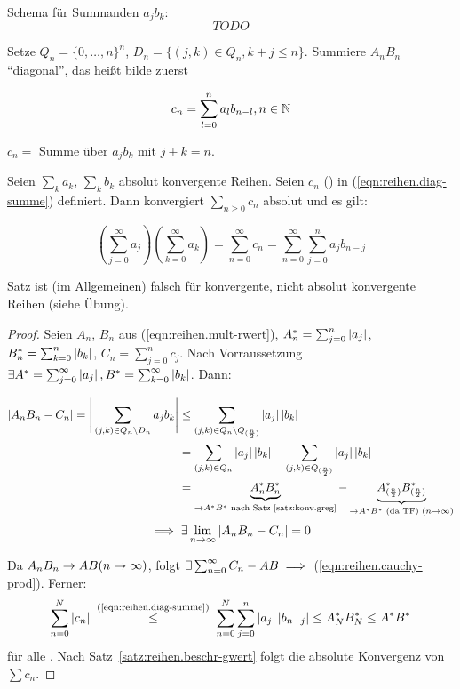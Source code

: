 \documentclass[12pt]{scrreprt}
\begin{document}
Schema für Summanden $a_jb_k$:
\[TODO\]

Setze $Q_n = \{0, \dotsc, n\}^n$, $D_n = \{(j, k) \in Q_n, k+j \le n\}$.
Summiere $A_nB_n$ "`diagonal"', das heißt bilde zuerst

\begin{equation}\label{eqn:reihen.diag-summe}
c_n = \sum_{l=0}^n a_lb_{n-l}, n \in \mathbb{N}
\end{equation}

$c_n = $ Summe über $a_jb_k$ mit $j+k = n$.

\begin{satz}\label{satz:reihen.cauchy-prod}
Seien $\sum_k a_k$, $\sum_k b_k$ absolut konvergente Reihen. Seien $c_n$ () in (\ref{eqn:reihen.diag-summe}) definiert.
Dann konvergiert $\sum_{n\ge0} c_n$ absolut und es gilt:

\begin{equation}\label{eqn:reihen.cauchy-prod}
\left(\sum_{j=0}^\infty a_j\right)\left(\sum_{k=0}^\infty a_k\right) = \sum_{n=0}^\infty c_n = \sum_{n=0}^\infty \sum_{j=0}^n a_jb_{n-j}
\end{equation}
\end{satz}

\begin{bem*}
Satz ist (im Allgemeinen) falsch für konvergente, nicht absolut konvergente Reihen (siehe Übung).
\end{bem*}

\begin{proof}
Seien $A_n$, $B_n$ aus (\ref{eqn:reihen.mult-rwert}), $A_n^* = \sum_{j=0}^n \left\lvert a_j\right\lvert$, $B_n^* = \sum_{k=0}^n \left\lvert b_k\right\lvert$,
$C_n = \sum_{j=0}^n c_j$. Nach Vorraussetzung $\exists A^* = \sum_{j=0}^\infty \left\lvert a_j\right\lvert, B^* = \sum_{k=0}^\infty \left\lvert b_k\right\lvert$.
Dann:

\begin{align*}
\left\lvert A_nB_n - C_n\right\lvert = \Bigg\lvert\sum_{(j,k)\in Q_n\setminus D_n} a_jb_k\Bigg\lvert &\le 
	\sum_{(j,k)\in Q_n\setminus Q_{(\frac{n}{2})}} \left\lvert a_j\right\lvert\left\lvert b_k\right\lvert \\
	&= \sum_{(j,k)\in Q_n} \left\lvert a_j\right\lvert\left\lvert b_k\right\lvert - \sum_{(j,k)\in Q_{(\frac{n}{2})}} \left\lvert a_j\right\lvert\left\lvert b_k\right\lvert\\
	&= \underbrace{A_n^*B_n^*}_{\to A^*B^*\text{ nach
            Satz~\ref{satz:konv.greg}}} -
          \underbrace{A_{(\frac{n}{2})}^*B_{(\frac{n}{2})}^*}_{\to
            A^*B^*\text{ (da TF) }(n\rightarrow\infty)}
\end{align*}
\[\implies \exists\lim_{n\rightarrow\infty} \left\lvert A_nB_n - C_n\right\lvert = 0\]

Da $A_nB_n \rightarrow AB (n\rightarrow\infty)$, folgt $\exists\sum_{n=0}^\infty C_n - AB \implies$ (\ref{eqn:reihen.cauchy-prod}).
Ferner: \[\sum_{n=0}^N \abs{c_n} \nach{\le}{(\ref{eqn:reihen.diag-summe})}
\sum_{n=0}^N\sum_{j=0}^n \abs{a_j}\abs{b_{n-j}} \le %
A_N^*B_N^* \le A^*B^*\] für alle . Nach Satz~\ref{satz:reihen.beschr-gwert} folgt die absolute Konvergenz von $\sum c_n$.
\end{proof}
\end{document}
